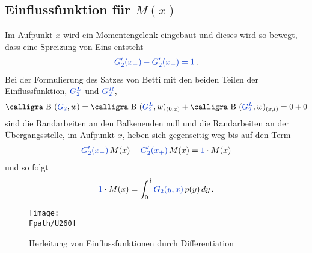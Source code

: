 {\textcolor{sectionTitleBlue}{\subsection{Einflussfunktion f\"{u}r $M(x)$}}}
Im Aufpunkt $x$ wird ein Momentengelenk eingebaut und dieses wird so bewegt, dass eine Spreizung von Eins entsteht
\begin{align}
\textcolor{chapterTitleBlue}{G_2'(x_{-}) - G_2'(x_+) = 1}\,.
\end{align}
Bei der Formulierung des Satzes von Betti mit den beiden Teilen der Einflussfunktion, $\textcolor{chapterTitleBlue}{G_2^L}$ und $\textcolor{chapterTitleBlue}{G_2^R}$,
\begin{align}
\text{\normalfont\calligra B\,\,}(\textcolor{chapterTitleBlue}{G_2},w) = \text{\normalfont\calligra B\,\,}(\textcolor{chapterTitleBlue}{G_2^L},w)_{(0,x)} + \text{\normalfont\calligra B\,\,}(\textcolor{chapterTitleBlue}{G_2^L},w)_{(x,l)} = 0 + 0
\end{align}
sind die Randarbeiten an den Balkenenden null und die Randarbeiten an der \"{U}bergangsstelle, im Aufpunkt $x$, heben sich gegenseitig weg bis auf den Term
\begin{align}
\textcolor{chapterTitleBlue}{G_2'(x_{-})}\,M(x) - \textcolor{chapterTitleBlue}{G_2'(x_+)}\,M(x) = \textcolor{chapterTitleBlue}{1} \cdot M(x)
\end{align}
und so folgt
\begin{align}
\textcolor{chapterTitleBlue}{1} \cdot M(x) = \int_0^{\,l} \textcolor{chapterTitleBlue}{G_2(y,x)}\,p(y)\,dy\,.
\end{align}
\begin{figure}[tbp]
\centering
\if {} \sidecaption \fi
\texttt{[image: \\Fpath/U260]}
\caption{Herleitung von Einflussfunktionen durch Differentiation} \label{U260}
\end{figure}%


